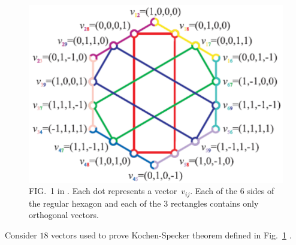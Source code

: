 \documentclass[english,reprint, aps, prl,superscriptaddress, showpacs,
showkeys, longbibliography, amsmath, amssymb, floatfix]{revtex4-1}
\theoremstyle{plain}
\theoremstyle{definition}
\begin{document}
\begin{figure}

\includegraphics[scale=0.8]{Cabello}\caption{\label{fig:Cabello}FIG.~1 in \cite{Cabello_2008}. Each dot represents
a vector~$v_{ij}$. Each of the $6$ sides of the regular hexagon
and each of the $3$ rectangles contains only orthogonal vectors.}
\end{figure}
Consider $18$ vectors used to prove Kochen-Specker theorem defined
in Fig.~\ref{fig:Cabello} \cite{CabelloEstebaranzGarcia-Alcaine1996,Cabello_2008}.


\end{document}
